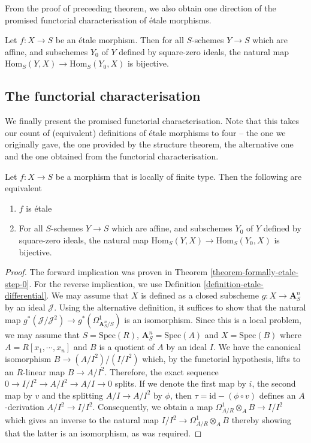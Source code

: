 \noindent
From the proof of preceeding theorem, we also obtain one direction of the
promised functorial characterisation of \'etale morphisms.

\begin{theorem}
\label{theorem-formally-etale-step-0}
Let $f:X \to S$ be an \'etale morphism. Then for all $S$-schemes $Y \to S$
which are affine, and subschemes $Y_0$ of $Y$ defined by square-zero ideals,
the natural map $\text{Hom}_S(Y,X) \to \text{Hom}_S(Y_0,X)$ is bijective.
\end{theorem}

\subsection{The functorial characterisation}
\label{subsection-functorial-etale}

\noindent
We finally present the promised functorial characterisation. Note that this
takes our count of (equivalent) definitions of \'etale morphisms to four --
the one we originally gave, the one provided by the structure theorem, the
alternative one and the one obtained from the functorial characterisation. 

\begin{theorem}
\label{theorem-formally-etale}
Let $f:X \to S$ be a morphism that is locally of finite type. Then the
following are equivalent
\begin{enumerate}
\item $f$ is \'etale
\item For all $S$-schemes $Y \to S$ which are affine, and subschemes $Y_0$
of $Y$ defined by square-zero ideals, the natural map
$\text{Hom}_S(Y,X) \to \text{Hom}_S(Y_0,X)$ is bijective.
\end{enumerate}
\end{theorem}

\begin{proof}
The forward implication was proven in Theorem
\ref{theorem-formally-etale-step-0}. For the reverse implication, we use
Definition \ref{definition-etale-differential}. We may assume that $X$ is
defined as a closed subscheme $g: X \to \mathbf{A}^n_S$ by an ideal $\mathcal{J}$. Using the
alternative definition, it suffices to show that the natural map
$g^*(\mathcal{J}/\mathcal{J}^2) \to g^*(\Omega^1_{\mathbf{A}^n_S/S})$ is an isomorphism. Since this is
a local problem, we may assume that $S = \text{Spec}(R)$, $\mathbf{A}^n_S = \text{Spec}(A)$ and
$X = \text{Spec}(B)$ where $A = R[x_1,\cdots,x_n]$ and $B$ is a quotient of $A$ by
an ideal $I$. We have the canonical isomorphism $B \to (A/I^2)/(I/I^2)$
which, by the functorial hypothesis, lifts to an $R$-linear map
$B \to A/I^2$. Therefore, the exact sequence
$0 \to I/I^2 \to A/I^2 \to A/I \to 0$ splits. If we denote the first map
by $i$, the second map by $v$ and the splitting $A/I \to A/I^2$ by $\phi$,
then $\tau = \mathrm{id} - (\phi \circ v)$ defines an $A$-derivation
$A/I^2 \to I/I^2$. Consequently, we obtain a map
$\Omega^1_{A/R} \otimes_A B \to I/I^2$ which gives an inverse to the
natural map $I/I^2 \to \Omega^1_{A/R} \otimes_A B$ thereby showing that
the latter is an isomorphism, as was required.
\end{proof}

